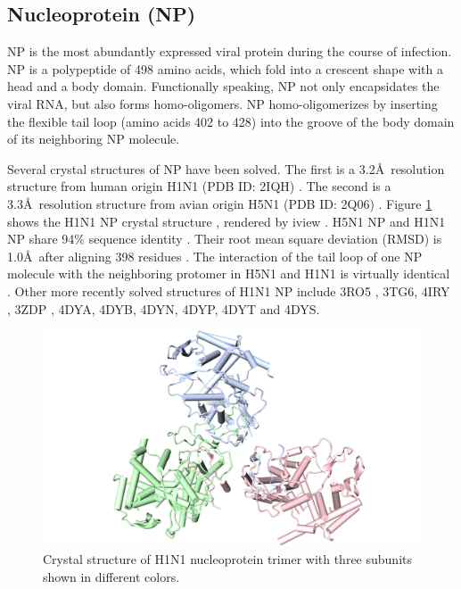 \subsection{Nucleoprotein (NP)}

NP is the most abundantly expressed viral protein during the course of infection. NP is a polypeptide of 498 amino acids, which fold into a crescent shape with a head and a body domain. Functionally speaking, NP not only encapsidates the viral RNA, but also forms homo-oligomers. NP homo-oligomerizes by inserting the flexible tail loop (amino acids 402 to 428) into the groove of the body domain of its neighboring NP molecule.

Several crystal structures of NP have been solved. The first is a 3.2\AA\ resolution structure from human origin H1N1 (PDB ID: 2IQH) \citep{1140}. The second is a 3.3\AA\ resolution structure from avian origin H5N1 (PDB ID: 2Q06) \citep{1231}. Figure \ref{influenza:2IQH} shows the H1N1 NP crystal structure \citep{1140}, rendered by iview \citep{1366}. H5N1 NP and H1N1 NP share 94\% sequence identity \citep{1231}. Their root mean square deviation (RMSD) is 1.0\AA\ after aligning 398 residues \citep{1231}. The interaction of the tail loop of one NP molecule with the neighboring protomer in H5N1 and H1N1 is virtually identical \citep{1231}. Other more recently solved structures of H1N1 NP include 3RO5 \citep{1583}, 3TG6, 4IRY \citep{1584}, 3ZDP \citep{1573}, 4DYA, 4DYB, 4DYN, 4DYP, 4DYT and 4DYS.

\begin{figure}
\centering
\includegraphics[width=\linewidth]{../influenza/2IQH.png}
\caption{Crystal structure of H1N1 nucleoprotein trimer with three subunits shown in different colors.}
\label{influenza:2IQH}
\end{figure}

